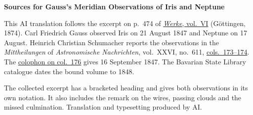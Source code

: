 \clearpage\thispagestyle{empty}
\begin{center}\textbf{Sources for Gauss’s Meridian Observations of Iris and Neptune}\end{center}
\noindent This AI translation follows the excerpt on p.~474 of \href{https://gdz.sub.uni-goettingen.de/id/PPN236007467}{\textit{Werke}, vol.~VI} (Göttingen, 1874). Carl Friedrich Gauss observed Iris on 21 August 1847 and Neptune on 17 August. Heinrich Christian Schumacher reports the observations in the \textit{Mittheilungen} of \textit{Astronomische Nachrichten}, vol.~XXVI, no.~611, \href{https://api.digitale-sammlungen.de/iiif/image/v2/bsb10049451_00095/full/1800,/0/default.jpg}{cols.~173--174}. The \href{https://api.digitale-sammlungen.de/iiif/image/v2/bsb10049451_00096/full/1800,/0/default.jpg}{colophon on col.~176} gives 16 September 1847. The Bavarian State Library catalogue dates the bound volume to 1848.
\par\smallskip\noindent The collected excerpt has a bracketed heading and gives both observations in its own notation. It also includes the remark on the wires, passing clouds and the missed culmination. Translation and typesetting produced by AI.
\clearpage
